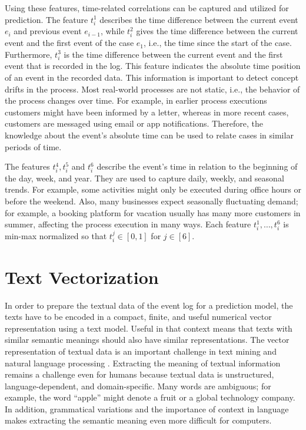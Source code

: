 Using these features, time-related correlations can be captured and utilized for prediction.
The feature $t_i^1$ describes the time difference between the current event $e_i$ and previous event $e_{i-1}$, while $t_i^2$ gives the time difference between the current event and the first event of the case $e_1$, i.e., the time since the start of the case.
Furthermore, $t_i^3$ is the time difference between the current event and the first event that is recorded in the log.
This feature indicates the absolute time position of an event in the recorded data.
This information is important to detect concept drifts \cite{DBLP:journals/tnn/BoseAZP14} in the process.
Most real-world processes are not static, i.e., the behavior of the process changes over time.
For example, in earlier process executions customers might have been informed by a letter, whereas in more recent cases, customers are messaged using email or app notifications.
Therefore, the knowledge about the event’s absolute time can be used to relate cases in similar periods of time.

The features $t_i^4, t_i^5$ and $t_i^6$ describe the event’s time in relation to the beginning of the day, week, and year.
They are used to capture daily, weekly, and seasonal trends.
For example, some activities might only be executed during office hours or before the weekend.
Also, many businesses expect seasonally fluctuating demand; for example, a booking platform for vacation usually has many more customers in summer, affecting the process execution in many ways.
Each feature $t_i^1, \dots, t_i^6$ is min-max normalized so that $t_i^j \in [0,1]$ for $j \in [6]$.

\section{Text Vectorization}\label{sec:text}

In order to prepare the textual data of the event log for a prediction model, the texts have to be encoded in a compact, finite, and useful numerical vector representation using a text model.
Useful in that context means that texts with similar semantic meanings should also have similar representations.
The vector representation of textual data is an important challenge in text mining and natural language processing \cite{DBLP:books/daglib/0001548}.
Extracting the meaning of textual information remains a challenge even for humans because textual data is unstructured, language-dependent, and domain-specific.
Many words are ambiguous; for example, the word \enquote{apple} might denote a fruit or a global technology company.
In addition, grammatical variations and the importance of context in language makes extracting the semantic meaning even more difficult for computers.

